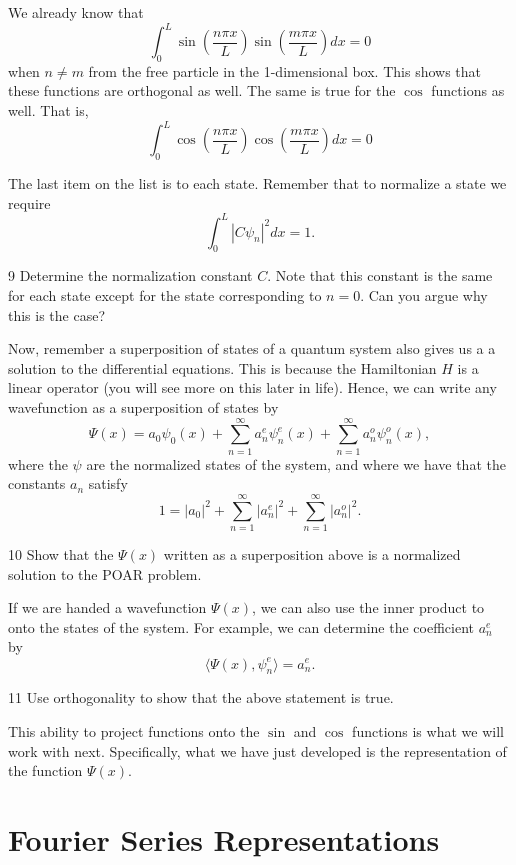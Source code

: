 \documentclass{article}
\begin{document}
We already know that 
\[
\int_0^L \sin\left(\frac{n\pi x}{L}\right)\sin\left(\frac{m\pi x}{L}\right)dx=0
\]
when $n\neq m$ from the free particle in the 1-dimensional box.  This shows that these functions are orthogonal as well.  The same is true for the $\cos$ functions as well. That is,
\[
\int_0^L \cos\left(\frac{n\pi x}{L}\right)\cos\left(\frac{m\pi x}{L}\right)dx=0
\]

The last item on the list is to  each state. Remember that to normalize a state we require
\[
\int_0^L |C\psi_n|^2 dx = 1. 
\]
\begin{problem}{}{9}
Determine the normalization constant $C$.  Note that this constant is the same for each state except for the state corresponding to $n=0$. Can you argue why this is the case?
\end{problem}

Now, remember a superposition of states of a quantum system also gives us a a solution to the differential equations. This is because the Hamiltonian $H$ is a linear operator (you will see more on this later in life).  Hence, we can write any wavefunction as a superposition of states by
\[
\Psi(x) = a_0\psi_0(x) + \sum_{n=1}^\infty a_n^e \psi_n^e(x) + \sum_{n=1}^\infty a_n^o \psi_n^o(x),
\]
where the $\psi$ are the normalized states of the system, and where we have that the constants $a_n$ satisfy
\[
1=|a_0|^2+\sum_{n=1}^\infty |a_n^e|^2 + \sum_{n=1}^\infty |a_n^o|^2.
\]
\begin{problem}{}{10}
Show that the $\Psi(x)$ written as a superposition above is a normalized solution to the POAR problem.
\end{problem}

If we are handed a wavefunction $\Psi(x)$, we can also use the inner product to  onto the states of the system.  For example, we can determine the coefficient $a_n^e$ by
\[
\langle \Psi(x),\psi_n^e\rangle = a_n^e.
\]

\begin{problem}{}{11}
Use orthogonality to show that the above statement is true.
\end{problem}

This ability to project functions onto the $\sin$ and $\cos$ functions is what we will work with next. Specifically, what we have just developed is the  representation of the function $\Psi(x)$.

\section{Fourier Series Representations}
\end{document}
